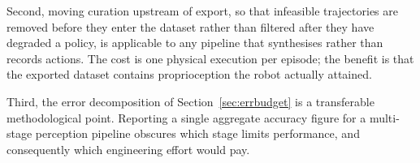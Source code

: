Second, moving curation upstream of export, so that infeasible trajectories are
removed before they enter the dataset rather than filtered after they have
degraded a policy, is applicable to any pipeline that synthesises rather than
records actions. The cost is one physical execution per episode; the benefit is
that the exported dataset contains proprioception the robot actually attained.

Third, the error decomposition of Section~\ref{sec:errbudget} is a
transferable methodological point. Reporting a single aggregate accuracy figure
for a multi-stage perception pipeline obscures which stage limits performance,
and consequently which engineering effort would pay.
